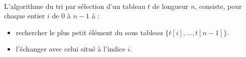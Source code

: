 \documentclass[11pt,a4paper]{article}
\begin{document}
\begin{Exercise}[title = {Tri par sélection}] \\
	L'algorithme du tri par sélection d'un tableau $t$ de longueur $n$, consiste, pour chaque entier $i$ de $0$ à $n-1$ à :
	\begin{itemize}
	\item rechercher le plus petit élément du sous tableau $\{t[i], \dots, t[n-1]\}$.
	\item l'échanger avec celui situé à l'indice $i$.
	\end{itemize}
\end{Exercise}
\end{document}
